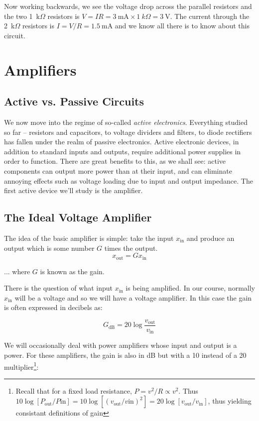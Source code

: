 \documentclass{tufte-book}
\begin{document}
\noindent Now working backwards, we see the voltage drop across the parallel resistors and the two 1~k$\Omega$ resistors is $V = IR = 3~\text{mA}\times1~k\Omega = 3~\text{V}$. The current through the 2~k$\Omega$ resistors is $I=V/R = 1.5~\text{mA}$ and we know all there is to know about this circuit.

\chapter{Amplifiers}
\section{Active vs. Passive Circuits}
We now move into the regime of so-called \textit{active electronics}. Everything studied so far -- resistors and capacitors, to voltage dividers and filters, to diode rectifiers has fallen under the realm of passive electronics. Active electronic devices, in addition to standard inputs and outputs, require additional power supplies in order to function. There are great benefits to this, as we shall see: active components can output more power than at their input, and can eliminate annoying effects such as voltage loading due to input and output impedance. The first active device we'll study is the amplifier.
\section{The Ideal Voltage Amplifier}
The idea of the basic amplifier is simple: take the input $x_\text{in}$ and produce an output which is some number $G$ times the output.
\begin{equation}
\label{eq:simple_amp}
x_\text{out} = Gx_\text{in}
\end{equation}

\noindent ... where $G$ is known as the gain.

There is the question of what input $x_\text{in}$ is being amplified. In our course, normally $x_\text{in}$ will be a voltage and so we will have a voltage amplifier. In this case the gain is often expressed in decibels as:

\begin{equation}
\label{eq:voltage_amp_dB}
G_\text{dB} = 20\log\frac{v_\text{out}}{v_\text{in}} 
\end{equation}

We will occasionally deal with power amplifiers whose input and output is a power. For these amplifiers, the gain is also in dB but with a 10 instead of a 20 multiplier\footnote{Recall that for a fixed load resistance, $P = v^2/R \propto v^2$. Thus $10\log\left[P_\text{out}/P\text{in}\right] = 10\log\left[\left(v_\text{out}/v\text{in}\right)^2\right] = 20\log\left[v_\text{out}/v_\text{in}\right]$, thus yielding consistant definitions of gain}:
\end{document}
